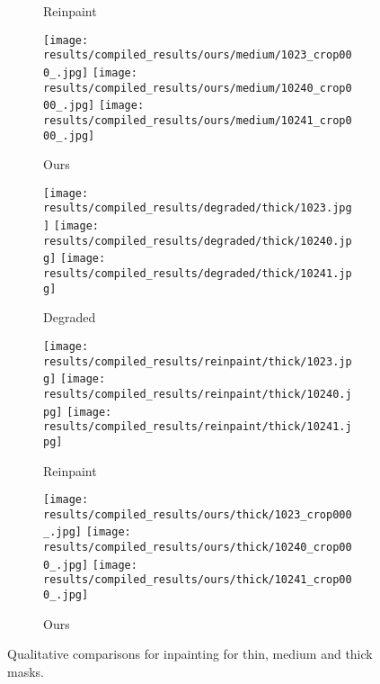 \begin{figure*}[t!]
\begin{subfigure}[t]{0.10\linewidth}
      \caption{Reinpaint}
    \end{subfigure}
    \begin{subfigure}[t]{0.10\linewidth}
      \captionsetup{justification=centering, labelformat=empty, font=scriptsize}
      \texttt{[image: results/compiled\_results/ours/medium/1023\_crop000\_.jpg]}
      \texttt{[image: results/compiled\_results/ours/medium/10240\_crop000\_.jpg]}
      \texttt{[image: results/compiled\_results/ours/medium/10241\_crop000\_.jpg]}
      \caption{Ours}
    \end{subfigure}
    \hspace{2mm}
    \begin{subfigure}[t]{0.10\linewidth}
      \captionsetup{justification=centering, labelformat=empty, font=scriptsize}
      \texttt{[image: results/compiled\_results/degraded/thick/1023.jpg]}
      \texttt{[image: results/compiled\_results/degraded/thick/10240.jpg]}
      \texttt{[image: results/compiled\_results/degraded/thick/10241.jpg]}
      \caption{Degraded}
    \end{subfigure}
    \begin{subfigure}[t]{0.10\linewidth}
      \captionsetup{justification=centering, labelformat=empty, font=scriptsize}
      \texttt{[image: results/compiled\_results/reinpaint/thick/1023.jpg]}
      \texttt{[image: results/compiled\_results/reinpaint/thick/10240.jpg]}
      \texttt{[image: results/compiled\_results/reinpaint/thick/10241.jpg]}
      \caption{Reinpaint}
    \end{subfigure}
    \begin{subfigure}[t]{0.10\linewidth}
      \captionsetup{justification=centering, labelformat=empty, font=scriptsize}
      \texttt{[image: results/compiled\_results/ours/thick/1023\_crop000\_.jpg]}
      \texttt{[image: results/compiled\_results/ours/thick/10240\_crop000\_.jpg]}
      \texttt{[image: results/compiled\_results/ours/thick/10241\_crop000\_.jpg]}
      \caption{Ours}
    \end{subfigure}
    \vspace{-3mm}    
    \caption{Qualitative comparisons for inpainting for thin, medium and thick masks.}
    \label{fig:sup4inp}
    \vspace{-2mm}
  \end{figure*}